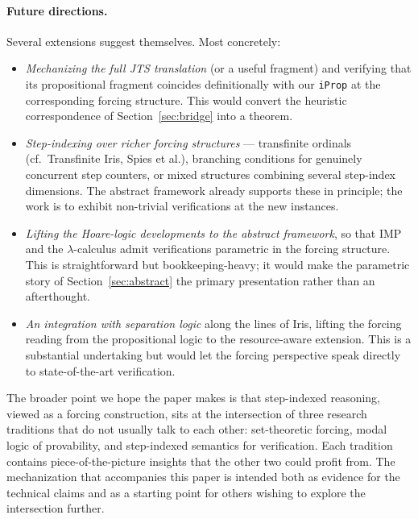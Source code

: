 \documentclass[11pt]{article}
\begin{document}
\paragraph{Future directions.}
Several extensions suggest themselves. Most concretely:

\begin{itemize}

\item \emph{Mechanizing the full JTS translation} (or a useful
fragment) and verifying that its propositional fragment coincides
definitionally with our \texttt{iProp} at the corresponding forcing
structure. This would convert the heuristic correspondence of
Section~\ref{sec:bridge} into a theorem.

\item \emph{Step-indexing over richer forcing structures} ---
transfinite ordinals (cf.\ Transfinite Iris, Spies et al.),
branching conditions for genuinely concurrent step counters, or
mixed structures combining several step-index dimensions. The
abstract framework already supports these in principle; the work
is to exhibit non-trivial verifications at the new instances.

\item \emph{Lifting the Hoare-logic developments to the abstract
framework}, so that IMP and the $\lambda$-calculus admit
verifications parametric in the forcing structure. This is
straightforward but bookkeeping-heavy; it would make the
parametric story of Section~\ref{sec:abstract} the primary
presentation rather than an afterthought.

\item \emph{An integration with separation logic} along the lines
of Iris, lifting the forcing reading from the propositional logic
to the resource-aware extension. This is a substantial undertaking
but would let the forcing perspective speak directly to
state-of-the-art verification.

\end{itemize}

The broader point we hope the paper makes is that step-indexed
reasoning, viewed as a forcing construction, sits at the
intersection of three research traditions that do not usually talk
to each other: set-theoretic forcing, modal logic of provability,
and step-indexed semantics for verification. Each tradition contains
piece-of-the-picture insights that the other two could profit from.
The mechanization that accompanies this paper is intended both as
evidence for the technical claims and as a starting point for
others wishing to explore the intersection further.
\end{document}
